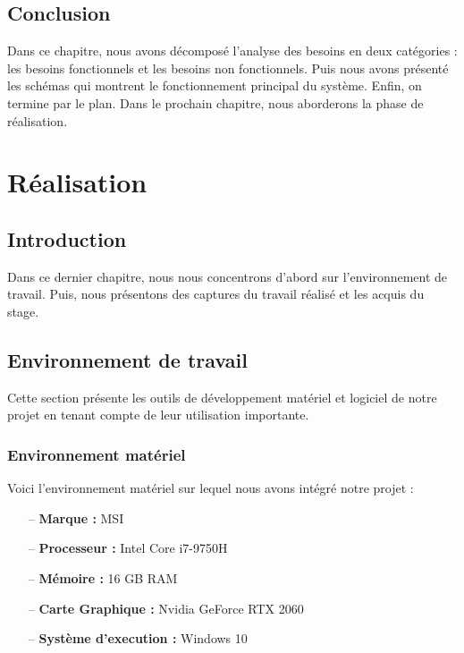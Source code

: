 \documentclass[12pt,a4paper,oneside,french]{book}
\begin{document}
\section*{Conclusion}
Dans ce chapitre, nous avons décomposé l’analyse des besoins en deux catégories : les besoins fonctionnels et les besoins non fonctionnels. Puis nous avons présenté les schémas qui montrent le fonctionnement principal du système. Enfin, on termine par le plan. Dans le prochain chapitre, nous aborderons la phase de réalisation.



\chapter{Réalisation}
\label{ch:3eme}

\section*{Introduction}
Dans ce dernier chapitre, nous nous concentrons d'abord sur l'environnement de travail. Puis, nous présentons des captures du travail réalisé et les acquis du stage.
\section{Environnement de travail}
Cette section présente les outils de développement matériel et logiciel de notre projet en tenant
compte de leur utilisation importante.
\subsection{Environnement matériel}
Voici l’environnement matériel sur lequel nous avons intégré notre projet :
\begin{itemize}
\item[--] \textbf{Marque :} MSI
\item[--] \textbf{Processeur :} Intel Core i7-9750H
\item[--] \textbf{Mémoire :} 16 GB RAM
\item[--] \textbf{Carte Graphique :} Nvidia GeForce RTX 2060
\item[--] \textbf{Système d'execution :} Windows 10
\end{itemize}
\end{document}
